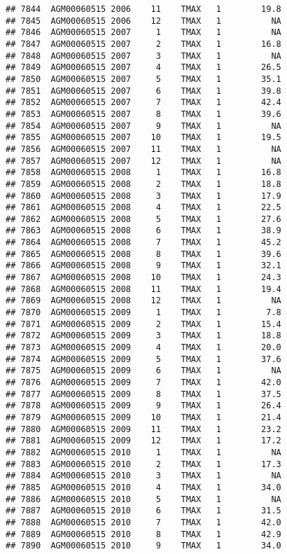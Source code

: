 \documentclass{article}\usepackage[]{graphicx}\usepackage[]{color}
\makeatletter
\newenvironment{kframe}{%
 \def\at@end@of@kframe{}%
 \ifinner\ifhmode%
  \def\at@end@of@kframe{\end{minipage}}%
  \begin{minipage}{\columnwidth}%
 \fi\fi%
 \def\FrameCommand##1{\hskip\@totalleftmargin \hskip-\fboxsep
 \colorbox{shadecolor}{##1}\hskip-\fboxsep
     \hskip-\linewidth \hskip-\@totalleftmargin \hskip\columnwidth}%
 \MakeFramed {\advance\hsize-\width
   \@totalleftmargin\z@ \linewidth\hsize
   \@setminipage}}%
 {\par\unskip\endMakeFramed%
 \at@end@of@kframe}
\newenvironment{knitrout}{}{} %
\makeatother
\begin{document}
\begin{knitrout}
\begin{kframe}
\begin{verbatim}
## 7844  AGM00060515 2006    11    TMAX   1        19.8
## 7845  AGM00060515 2006    12    TMAX   1          NA
## 7846  AGM00060515 2007     1    TMAX   1          NA
## 7847  AGM00060515 2007     2    TMAX   1        16.8
## 7848  AGM00060515 2007     3    TMAX   1          NA
## 7849  AGM00060515 2007     4    TMAX   1        26.5
## 7850  AGM00060515 2007     5    TMAX   1        35.1
## 7851  AGM00060515 2007     6    TMAX   1        39.8
## 7852  AGM00060515 2007     7    TMAX   1        42.4
## 7853  AGM00060515 2007     8    TMAX   1        39.6
## 7854  AGM00060515 2007     9    TMAX   1          NA
## 7855  AGM00060515 2007    10    TMAX   1        19.5
## 7856  AGM00060515 2007    11    TMAX   1          NA
## 7857  AGM00060515 2007    12    TMAX   1          NA
## 7858  AGM00060515 2008     1    TMAX   1        16.8
## 7859  AGM00060515 2008     2    TMAX   1        18.8
## 7860  AGM00060515 2008     3    TMAX   1        17.9
## 7861  AGM00060515 2008     4    TMAX   1        22.5
## 7862  AGM00060515 2008     5    TMAX   1        27.6
## 7863  AGM00060515 2008     6    TMAX   1        38.9
## 7864  AGM00060515 2008     7    TMAX   1        45.2
## 7865  AGM00060515 2008     8    TMAX   1        39.6
## 7866  AGM00060515 2008     9    TMAX   1        32.1
## 7867  AGM00060515 2008    10    TMAX   1        24.3
## 7868  AGM00060515 2008    11    TMAX   1        19.4
## 7869  AGM00060515 2008    12    TMAX   1          NA
## 7870  AGM00060515 2009     1    TMAX   1         7.8
## 7871  AGM00060515 2009     2    TMAX   1        15.4
## 7872  AGM00060515 2009     3    TMAX   1        18.8
## 7873  AGM00060515 2009     4    TMAX   1        20.0
## 7874  AGM00060515 2009     5    TMAX   1        37.6
## 7875  AGM00060515 2009     6    TMAX   1          NA
## 7876  AGM00060515 2009     7    TMAX   1        42.0
## 7877  AGM00060515 2009     8    TMAX   1        37.5
## 7878  AGM00060515 2009     9    TMAX   1        26.4
## 7879  AGM00060515 2009    10    TMAX   1        21.4
## 7880  AGM00060515 2009    11    TMAX   1        23.2
## 7881  AGM00060515 2009    12    TMAX   1        17.2
## 7882  AGM00060515 2010     1    TMAX   1          NA
## 7883  AGM00060515 2010     2    TMAX   1        17.3
## 7884  AGM00060515 2010     3    TMAX   1          NA
## 7885  AGM00060515 2010     4    TMAX   1        34.0
## 7886  AGM00060515 2010     5    TMAX   1          NA
## 7887  AGM00060515 2010     6    TMAX   1        31.5
## 7888  AGM00060515 2010     7    TMAX   1        42.0
## 7889  AGM00060515 2010     8    TMAX   1        42.9
## 7890  AGM00060515 2010     9    TMAX   1        34.0

\end{verbatim}
\end{kframe}
\end{knitrout}
\end{document}
